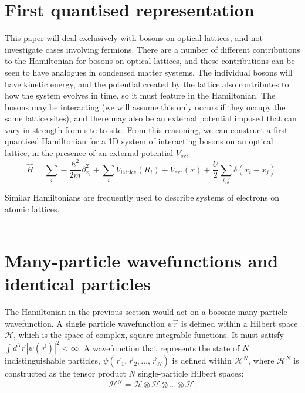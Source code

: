 \documentclass[a4paper,10pt]{article}
\begin{document}
\section{First quantised representation}
This paper will deal exclusively with bosons on optical lattices, and not investigate cases involving fermions.
There are a number of different contributions to the Hamiltonian for bosons on optical lattices, and these contributions can be seen to have analogues in condensed matter systems.
The individual bosons will have kinetic energy, and the potential created by the lattice also contributes to how the system evolves in time, so it must feature in the Hamiltonian.
The bosons may be interacting (we will assume this only occurs if they occupy the same lattice sites), and there may also be an external potential imposed that can vary in strength
from site to site. From this reasoning, we can construct a first quantised Hamiltonian for a 1D system of interacting bosons on an optical lattice, in the presence of an external potential $V_{\text{ext}}$
\begin{equation}
  \label{eq:HamiltonianCoordinateRepresentation}
 \hat{H}=\sum_{i}-\frac{\hbar^{2}}{2m}  \partial_{x_{i}}^2+\sum_{i}V_{\text{lattice}}(R_{i})+V_{\text{ext}}(x)+\frac{U}{2}\sum_{i,j}\delta(x_{i}-x_{j}).
\end{equation}

Similar Hamiltonians are frequently used to describe systems of electrons on atomic lattices.
\\\\


\section{Many-particle wavefunctions and identical particles}
The Hamiltonian in the previous section would act on a bosonic many-particle wavefunction. A single particle wavefunction $\psi{\vec{r}}$ is 
defined within a Hilbert space $\mathcal{H}$, which is the space of complex, square integrable functions. It must satisfy $\int d^3\vec{r}|\psi(\vec{r})|^2<\infty$.
A wavefunction that represents the state of $N$ indistinguishable particles, $\psi(\vec{r}_{1},\vec{r}_{2},\dots,\vec{r}_{N})$ is defined within $\mathcal{H}^N$, where
$\mathcal{H}^N$ is constructed as the tensor product $N$ single-particle Hilbert spaces:
\begin{equation}
 \mathcal{H}^N=\mathcal{H}\otimes \mathcal{H} \otimes \dots\otimes \mathcal{H}.
\end{equation}
\end{document}
